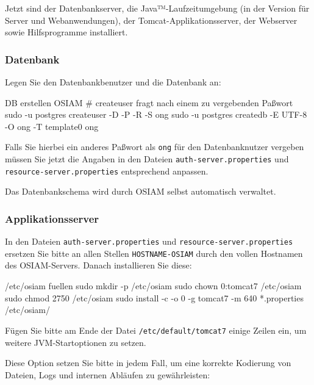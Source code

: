 Jetzt sind der Datenbankserver, die Java™-Laufzeitumgebung (in der
Version für Server und Webanwendungen), der Tomcat-Applikationsserver,
der Webserver sowie Hilfsprogramme installiert.

\subsubsection{Datenbank}\label{subsubsec:setup-osiam-db}

\begin{minipage}{\textwidth}
Legen Sie den Datenbankbenutzer und die Datenbank an:

\begin{lstdump}{DB erstellen OSIAM}
# createuser fragt nach einem zu vergebenden Paßwort
sudo -u postgres createuser -D -P -R -S ong
sudo -u postgres createdb -E UTF-8 -O ong -T template0 ong
\end{lstdump}

Falls Sie hierbei ein anderes Paßwort als \texttt{ong} für
den Datenbanknutzer vergeben müssen Sie jetzt die Angaben
in den Dateien \texttt{auth-server.properties} und
\texttt{resource-server.properties} entsprechend anpassen.
\end{minipage}

Das Datenbankschema wird durch OSIAM selbst automatisch verwaltet.

\subsubsection{Applikationsserver}\label{subsubsec:setup-osiam-tomcat}

\begin{minipage}{\textwidth}
In den Dateien \texttt{auth-server.properties} und
\texttt{resource-server.properties} ersetzen Sie bitte an allen
Stellen \texttt{HOSTNAME-OSIAM} durch den vollen Hostnamen des
OSIAM-Servers. Danach installieren Sie diese:

\begin{lstdump}{/etc/osiam fuellen}
sudo mkdir -p /etc/osiam
sudo chown 0:tomcat7 /etc/osiam
sudo chmod 2750 /etc/osiam
sudo install -c -o 0 -g tomcat7 -m 640 *.properties /etc/osiam/
\end{lstdump}
\end{minipage}

Fügen Sie bitte am Ende der Datei \texttt{/etc/default/tomcat7}
einige Zeilen ein, um weitere JVM-Startoptionen zu setzen.

\begin{minipage}{\textwidth}
Diese Option setzen Sie bitte in jedem Fall, um eine korrekte
Kodierung von Dateien, Logs und internen Abläufen zu gewährleisten:

\end{minipage}

